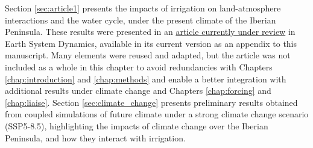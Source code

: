 \begin{table}[htbp]
    \centering
    \caption{Characteristics of coupled simulations used in this chapter.}
    \label{table:coupled_simulations_chap5}
\end{table}

Section \ref{sec:article1} presents the impacts of irrigation on land-atmosphere interactions and the water cycle, under the present climate of the Iberian Peninsula. These results were presented in an \href{https://egusphere.copernicus.org/preprints/2025/egusphere-2025-2491/}{article currently under review} in Earth System Dynamics, available in its current version as an appendix to this manuscript.
Many elements were reused and adapted, but the article was not included as a whole in this chapter to avoid redundancies with Chapters \ref{chap:introduction} and \ref{chap:methods} and enable a better integration with additional results under climate change and Chapters \ref{chap:forcing} and \ref{chap:liaise}. 
Section \ref{sec:climate_change} presents preliminary results obtained from coupled simulations of future climate under a strong climate change scenario (SSP5-8.5), highlighting the impacts of climate change over the Iberian Peninsula, and how they interact with irrigation.

\clearpage

